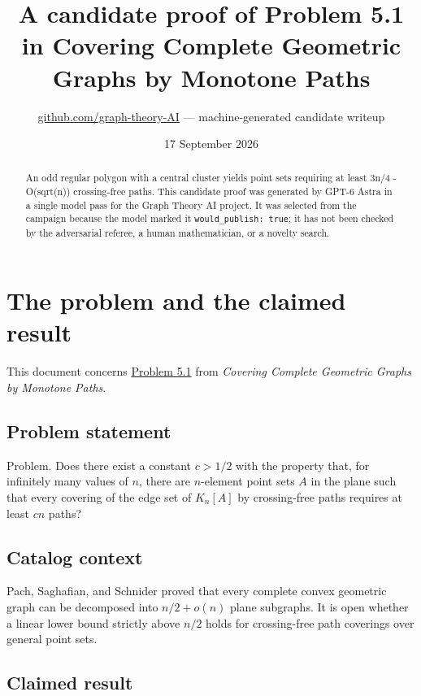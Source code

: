 \documentclass[
  11pt,
  a4paper,
]{article}
\title{A candidate proof of Problem 5.1 in Covering Complete Geometric
Graphs by Monotone Paths}
\author{\href{https://github.com/graph-theory-AI}{github.com/graph-theory-AI}
--- machine-generated candidate writeup}
\date{17 September 2026}
\begin{document}
\maketitle
\begin{abstract}
An odd regular polygon with a central cluster yields point sets
requiring at least 3n/4 - O(sqrt(n)) crossing-free paths. This candidate
proof was generated by GPT-6 Astra in a single model pass for the Graph
Theory AI project. It was selected from the campaign because the model
marked it \texttt{would\_publish:\ true}; it has not been checked by the
adversarial referee, a human mathematician, or a novelty search.
\end{abstract}

\section{The problem and the claimed
result}\label{the-problem-and-the-claimed-result}

This document concerns
\href{https://graph-theory-ai.github.io/graph-conjectures/arxiv/2507.10840__01/}{Problem
5.1} from \emph{Covering Complete Geometric Graphs by Monotone Paths}.

\subsection{Problem statement}\label{problem-statement}

Problem. Does there exist a constant \(c>1/2\) with the property that,
for infinitely many values of \(n\), there are \(n\)-element point sets
\(A\) in the plane such that every covering of the edge set of
\(K_{n}[A]\) by crossing-free paths requires at least \(cn\) paths?

\subsection{Catalog context}\label{catalog-context}

Pach, Saghafian, and Schnider proved that every complete convex
geometric graph can be decomposed into \(n/2 + o(n)\) plane subgraphs.
It is open whether a linear lower bound strictly above \(n/2\) holds for
crossing-free path coverings over general point sets.

\subsection{Claimed result}\label{claimed-result}
\end{document}
